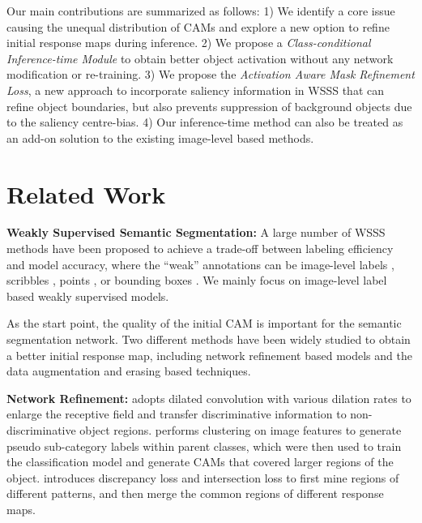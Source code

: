 \documentclass[10pt,twocolumn,letterpaper]{article}
\begin{document}
Our main contributions are summarized as follows:
1) We identify a core issue causing the unequal distribution of CAMs and explore a new option to refine initial response maps during inference.
2) We propose a \emph{Class-conditional Inference-time Module} to obtain better object activation without any network modification or re-training.
3) We propose the \emph{Activation Aware Mask Refinement Loss}, a new approach to incorporate saliency information in WSSS that can refine object boundaries, but also prevents suppression of background objects due to the saliency centre-bias. 
4) Our inference-time method can also be treated as an add-on solution to the existing image-level based methods.






\section{Related Work}
\noindent\textbf{Weakly Supervised Semantic Segmentation:}
A large number of WSSS methods have been proposed to achieve a trade-off between labeling efficiency and model accuracy, where the \enquote{weak} annotations can be
image-level labels \cite{huang2018weakly,wei2018revisiting,ahn2018learning,fan2020cian,papandreou2015weakly, wang2020self, chang2020weakly, zhang2020splitting, chen2020weakly, sun2020mining, zhang2020reliability, guo2019mixup, yun2019cutmix, fan2020learning, lee2021anti, yao2021non, wu2021embedded, lee2021railroad}, scribbles \cite{vernaza2017learning,lin2016scribblesup,tang2018regularized}, points \cite{bearman2016s}, or bounding boxes \cite{dai2015boxsup,papandreou2015weakly,khoreva2017simple,li2018weakly,song2019box, sun20203d}.
We mainly focus on image-level label based weakly supervised models.


As the start point, the quality of the initial CAM is important for the semantic segmentation network. Two different methods have been widely studied to obtain a better initial response map, including network refinement based models and the data augmentation and erasing based techniques.


\noindent\textbf{Network Refinement:
}
\cite{wei2018revisiting} adopts dilated convolution with various dilation rates to enlarge the receptive field and transfer 
discriminative information to 
non-discriminative object regions.
\cite{chang2020weakly} performs clustering on image features to generate pseudo sub-category labels within parent classes, which were then used
to train the classification model and generate
CAMs that
covered larger regions of the object.
\cite{zhang2020splitting} introduces discrepancy loss and intersection loss to first mine regions of different patterns, and then merge the common regions of different response maps.
\end{document}
